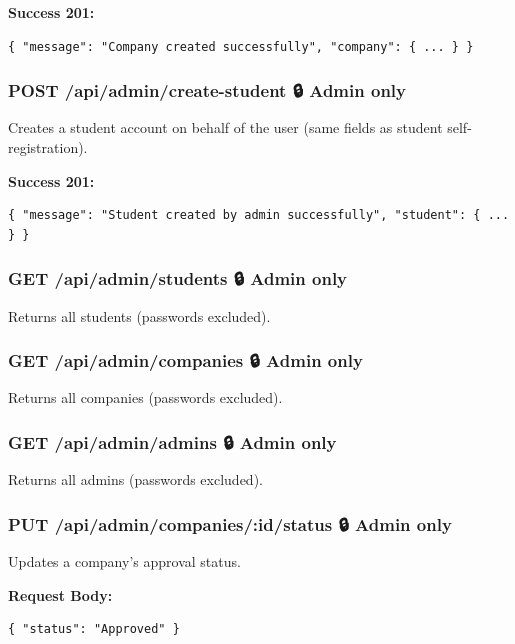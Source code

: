 \documentclass[12pt,a4paper]{article}
\begin{document}
\textbf{Success 201:}
\begin{lstlisting}[language={}]
{ "message": "Company created successfully", "company": { ... } }
\end{lstlisting}

\vspace{0.5cm}

\subsubsection*{POST /api/admin/create-student \quad 🔒 Admin only}

Creates a student account on behalf of the user (same fields as student self-registration).

\textbf{Success 201:}
\begin{lstlisting}[language={}]
{ "message": "Student created by admin successfully", "student": { ... } }
\end{lstlisting}

\vspace{0.5cm}

\subsubsection*{GET /api/admin/students \quad 🔒 Admin only}
Returns all students (passwords excluded).

\subsubsection*{GET /api/admin/companies \quad 🔒 Admin only}
Returns all companies (passwords excluded).

\subsubsection*{GET /api/admin/admins \quad 🔒 Admin only}
Returns all admins (passwords excluded).

\vspace{0.5cm}

\subsubsection*{PUT /api/admin/companies/:id/status \quad 🔒 Admin only}

Updates a company's approval status.

\textbf{Request Body:}
\begin{lstlisting}[language={}]
{ "status": "Approved" }
\end{lstlisting}
\end{document}
